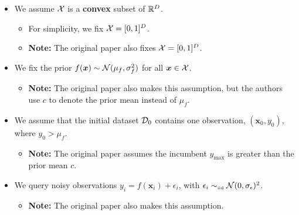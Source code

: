 \documentclass[11pt]{article}
\numberwithin{figure}{section}
\numberwithin{equation}{section}
\newcommand{\bs}[1]{\boldsymbol{#1}}
\def\bsx{\bs{x}}
\begin{document}
\begin{itemize}[label=]

  \item We assume $\mathcal{X}$ is a \textbf{convex} subset of $\mathbb{R}^{D}$.
  \begin{itemize}[label=]
    \item For simplicity, we fix $\mathcal{X} = [0, 1]^{D}$.
    \item \textbf{Note:} The original paper also fixes $\mathcal{X} = [0, 1]^{D}$. 
  \end{itemize}

  \item We fix the prior $f(\bsx) \sim \calN(\mu_{f}, \sigma_{f}^{2})$ for all $\bsx \in \calX$.
  \begin{itemize}[label=]
    \item \textbf{Note:} The original paper also makes this assumption, but the authors use $c$ to denote the prior mean instead of $\mu_{f}$.
  \end{itemize}

  \item We assume that the initial dataset $\mathcal{D}_{0}$ contains one observation, $\left(\bsx_{0}, y_{0}\right)$, where $y_{0} > \mu_{f}$.
  \begin{itemize}[label=]
    \item \textbf{Note:} The original paper assumes the incumbent $y_{\text{max}}$ is greater than the prior mean $c$. 
  \end{itemize}

  \item We query noisy observations $y_{i} = f(\bsx_{i}) + \epsilon_{i}$, with $\epsilon_{i} \sim_{\mbox{\tiny \textrm{iid}}} \mathcal{N}(0, \sigma_{\epsilon})^{2}$.
  \begin{itemize}[label=]
    \item \textbf{Note:} The original paper also makes this assumption.
  \end{itemize}


\end{itemize}
\end{document}
